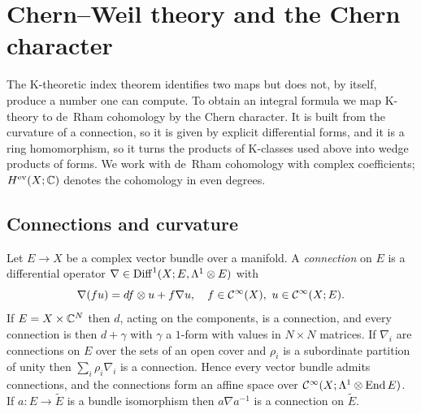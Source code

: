 \section{Chern--Weil theory and the Chern character}\label{families:sec:chern}

The K-theoretic index theorem identifies two maps but does not, by itself,
produce a number one can compute. To obtain an integral formula we map K-theory
to de~Rham cohomology by the Chern character. It is built from the curvature of a
connection, so it is given by explicit differential forms, and it is a ring
homomorphism, so it turns the products of K-classes used above into wedge
products of forms. We work with
de~Rham cohomology with complex coefficients; $H^{\mathrm{ev}}(X;\mathbb{C})$ denotes the
cohomology in even degrees.

\subsection{Connections and curvature}
Let $E\to X$ be a complex vector bundle over a manifold. A \emph{connection} on
$E$ is a differential operator $\nabla\in\operatorname{Diff}^{1}(X;E,\Lambda^1\otimes E)$
with
\begin{equation*}
  \nabla(fu)=df\otimes u+f\nabla u,\quad f\in\mathcal{C}^\infty(X),\ u\in\mathcal{C}^\infty(X;E).
\end{equation*}
If $E=X\times\mathbb{C}^N$ then $d$, acting on the components, is a connection, and
every connection is then $d+\gamma$ with $\gamma$ a $1$-form with values in
$N\times N$ matrices. If $\nabla_i$ are connections on $E$ over the sets of an
open cover and $\rho_i$ is a subordinate partition of unity then
$\sum_i\rho_i\nabla_i$ is a connection. Hence every vector bundle admits
connections, and the connections form an affine space over
$\mathcal{C}^\infty(X;\Lambda^1\otimes\operatorname{End} E)$. If $a:E\to\tilde E$ is a bundle isomorphism
then $a\nabla a^{-1}$ is a connection on $\tilde E$.


